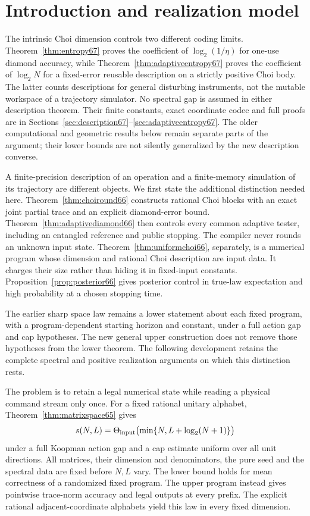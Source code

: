 \section{Introduction and realization model}

The intrinsic Choi dimension controls two different coding limits.
Theorem~\ref{thm:entropy67} proves the coefficient of
$\log_2(1/\eta)$ for one-use diamond accuracy, while
Theorem~\ref{thm:adaptiveentropy67} proves the coefficient of
$\log_2N$ for a fixed-error reusable description on a strictly positive
Choi body. The latter counts descriptions for general disturbing
instruments, not the mutable workspace of a trajectory simulator.
No spectral gap is assumed in either description theorem. Their
finite constants, exact coordinate codec and full proofs are in
Sections~\ref{sec:description67}--\ref{sec:adaptiveentropy67}.
The older computational and geometric results below remain separate
parts of the argument; their lower bounds are not silently generalized
by the new description converse.

A finite-precision description of an operation and a finite-memory
simulation of its trajectory are different objects. We first state the
additional distinction needed here. Theorem~\ref{thm:choiround66}
constructs rational Choi blocks with an exact joint partial trace and
an explicit diamond-error bound. Theorem~\ref{thm:adaptivediamond66}
then controls every common adaptive tester, including an entangled
reference and public stopping. The compiler never rounds an unknown
input state. Theorem~\ref{thm:uniformchoi66}, separately, is a numerical
program whose dimension and rational Choi description are input data.
It charges their size rather than hiding it in fixed-input constants.
Proposition~\ref{prop:posterior66} gives posterior control in true-law
expectation and high probability at a chosen stopping time.

The earlier sharp space law remains a lower statement about each fixed
program, with a program-dependent starting horizon and constant,
under a full action gap and cap hypotheses. The new general upper
construction does not remove those hypotheses from the lower theorem.
The following development retains the complete spectral and positive
realization arguments on which this distinction rests.


The problem is to retain a legal numerical state while reading a
physical command stream only once. For a fixed rational unitary
alphabet, Theorem~\ref{thm:matrixspace65} gives
\[
 s(N,L)=\Theta_{\rm input}\bigl(\min\{N,L+\log_2(N+1)\}\bigr)
\]
under a full Koopman action gap and a cap estimate uniform over
all unit directions. All matrices, their dimension and denominators,
the pure seed and the spectral data are fixed before $N,L$ vary.
The lower bound holds for mean correctness of a randomized fixed
program. The upper program instead gives pointwise trace-norm
accuracy and legal outputs at every prefix. The explicit rational
adjacent-coordinate alphabets yield this law in every fixed dimension.

